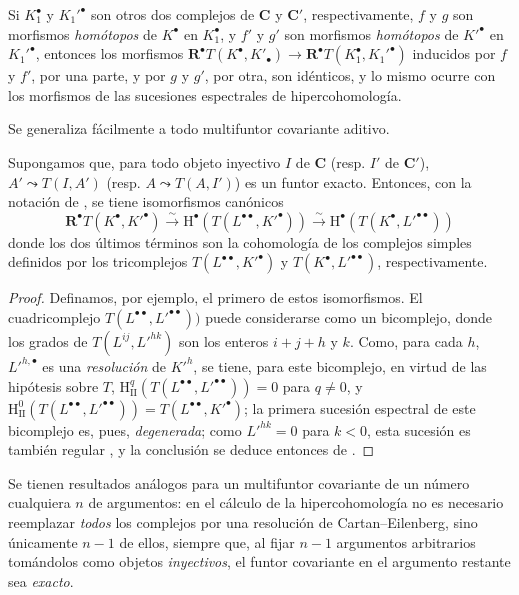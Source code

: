 \begin{env}[11.4.6]
Si $K_1^\bullet$ y $K_1'^\bullet$ son otros dos complejos de $\boldsymbol{C}$ y $\boldsymbol{C}'$, respectivamente, $f$ y $g$ son morfismos \emph{homótopos} de $K^\bullet$ en $K_1^\bullet$,
y $f'$ y $g'$ son morfismos \emph{homótopos} de $K'^\bullet$ en $K_1'^\bullet$, entonces los morfismos $\mathbf R^\bullet T(K^\bullet,K'_\bullet)\to
\mathbf R^\bullet T(K_1^\bullet,K_1'^\bullet)$ inducidos por $f$ y $f'$, por una parte, y por $g$ y $g'$, por otra, son idénticos, y lo mismo ocurre con los morfismos de las sucesiones espectrales de hipercohomología.

Se generaliza fácilmente a todo multifuntor covariante aditivo.
\end{env}

\begin{proposition}[11.4.7]
\label{0.11.4.7}
\label{0.11.4.7-fr}
Supongamos que, para todo objeto inyectivo $I$ de $\boldsymbol{C}$ \textup{(resp.} $I'$ de $\boldsymbol{C}'$), $A'\leadsto T(I,A')$ \textup{(resp.} $A\leadsto T(A,I')$) es un funtor exacto.
Entonces, con la notación de , se tiene isomorfismos canónicos
\[
  \label{0.11.4.7.1-fr}
  \mathbf R^\bullet T(K^\bullet,K'^\bullet)
  \xrightarrow{\sim}\mathrm H^\bullet(T(L^{\bullet\bullet},K'^\bullet))
  \xrightarrow{\sim}\mathrm H^\bullet(T(K^\bullet,L'^{\bullet\bullet}))
  \tag{11.4.7.1}
\]
donde los dos últimos términos son la cohomología de los complejos simples definidos por los tricomplejos $T(L^{\bullet\bullet},K'^\bullet)$ y $T(K^\bullet,L'^{\bullet\bullet})$, respectivamente.
\end{proposition}

\begin{proof}
Definamos, por ejemplo, el primero de estos isomorfismos.
El cuadricomplejo $T(L^{\bullet\bullet},L'^{\bullet\bullet}))$ puede considerarse como un bicomplejo, donde los grados de $T(L^{ij},L'^{hk})$ son los enteros $i+j+h$ y $k$.
Como, para cada $h$, $L'^{h,\bullet}$ es una \emph{resolución} de $K'^h$, se tiene, para este bicomplejo, en virtud de las hipótesis sobre $T$, $\mathrm H_{\mathrm{II}}^q(T(L^{\bullet\bullet},L'^{\bullet\bullet}))=0$ para $q\neq0$, y $\mathrm H_{\mathrm{II}}^0(T(L^{\bullet\bullet},L'^{\bullet\bullet}))
=T(L^{\bullet\bullet},K'^\bullet)$;
la primera sucesión espectral de este bicomplejo es, pues, \emph{degenerada};
como $L'^{hk}=0$ para $k<0$, esta sucesión es también regular , y la conclusión se deduce entonces de .
\end{proof}

Se tienen resultados análogos para un multifuntor covariante de un número cualquiera $n$ de argumentos: en el cálculo de la hipercohomología no es necesario reemplazar \emph{todos} los complejos
por una resolución de Cartan--Eilenberg, sino únicamente $n-1$ de ellos, siempre que, al fijar $n-1$ argumentos arbitrarios tomándolos como objetos \emph{inyectivos}, el funtor covariante en el argumento restante sea \emph{exacto}.


